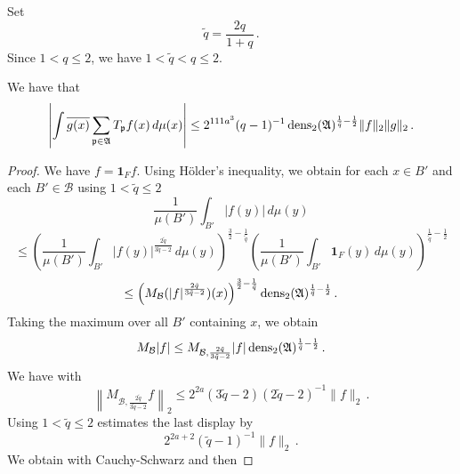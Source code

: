 Set
\begin{equation}
    \tilde{q}=\frac {2q}{1+q}\,.
\end{equation}
Since $1< q\le 2$, we have $1<\tilde{q}<q\le 2$.
\begin{lemma}
\label{dens2-antichain}
\leanok
We have that
\begin{equation}\label{eqttt9}
  \left|\int \overline{g(x)} \sum_{{\mathfrak p} \in \mathfrak{A}} T_{{\mathfrak p}} f(x)\, d\mu(x)\right|\le
  2^{111a^3}({q}-1)^{-1} \operatorname{\operatorname{dens}}_2(\mathfrak{A})^{\frac 1{\tilde{q}}-\frac 12} \|f\|_2\|g\|_2\, .
\end{equation}
\end{lemma}
\begin{proof}
We have $f=\mathbf{1}_Ff$. Using H\"older's inequality, we obtain for
each $x\in B'$ and each $B'\in \mathcal{B}$ using $1<\tilde{q}\le 2$
\begin{equation}
    \frac 1{\mu(B')}\int_{B'} |f(y)|\, d\mu(y)
\end{equation}
\begin{equation}
    \le
    \left(\frac 1{\mu(B')}\int_{B'} |f(y)|^{\frac {2{\tilde{q}}}{3\tilde{q}-2}}\, d\mu(y)\right)^{\frac 32-\frac 1{\tilde{q}}}
    \left(\frac 1{\mu(B')}\int_{B'} \mathbf{1}_F(y)\, d\mu(y)\right)^{\frac 1{\tilde{q}}-\frac 12}
\end{equation}
\begin{equation}
    \le \left(M_{\mathcal{B}} (|f|^{\frac {2{\tilde{q}}}{3{\tilde{q}}-2}})(x)\right)^{\frac 32-\frac 1{\tilde{q}}}
\operatorname{\operatorname{dens}}_2(\mathfrak{A})^{\frac 1{\tilde{q}}-\frac 12}\, .
\end{equation}
Taking the maximum over all $B'$ containing $x$, we obtain
\begin{equation} \label{eqttt1}
    M_{\mathcal{B}}|f|\le
    M_{\mathcal{B},\frac {2{\tilde{q}}}{3{\tilde{q}}-2} } |f|
    \operatorname{\operatorname{dens}}_2(\mathfrak{A})^{\frac 1{\tilde{q}}-\frac 12}\, .
\end{equation}
We have with 
\begin{equation}
\left\|M_{\mathcal{B}, \frac {2{\tilde{q}}}{3{\tilde{q}}-2}} f\right\|_2\le 2^{2a}(3\tilde{q}-2)(2\tilde{q}-2)^{-1}\|f\|_2\, .
\end{equation}
Using $1<\tilde{q}\le 2$ estimates the last display by
\begin{equation}\label{eqttt2}
 2^{2a+2} (\tilde{q}-1)^{-1} \|f\|_2\, .
\end{equation}
We obtain with Cauchy-Schwarz
and then 

\end{proof}
